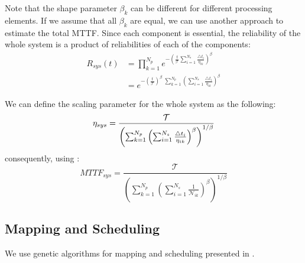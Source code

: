 Note that the shape parameter $\beta_k$ can be different for different processing elements. If we assume that all $\beta_k$ are equal, we can use another approach to estimate the total MTTF. Since each component is essential, the reliability of the whole system is a product of reliabilities of each of the components:
\begin{align*}
  R_{sys}(t) & = \prod_{k=1}^{N_p} e^{-\left( \frac{t}{\mathcal{T}} \sum_{i=1}^{N_s} \frac{\triangle t_i}{\eta_{ik}} \right)^{\beta}} \\
  & = e^{- \left(\frac{t}{\mathcal{T}}\right)^{\beta} \; \sum_{k = 1}^{N_p} \left(  \sum_{i=1}^{N_s} \frac{\triangle t_i}{\eta_{ik}} \right)^{\beta}}
\end{align*}

We can define the scaling parameter for the whole system as the following:
\[
  \eta_{sys} = \frac{\mathcal{T}}{\left(\sum_{k=1}^{N_p} \left(\sum_{i=1}^{N_s}\frac{\triangle t_i}{\eta_{ik}}\right)^{\beta} \right)^{1/\beta}} \\
\]
consequently, using :
\[
  MTTF_{sys} = \frac{\mathcal{T}}{\left(\sum_{k=1}^{N_p} \left(\sum_{i=1}^{N_s}\frac{1}{\mathcal{N}_{ik}}\right)^{\beta} \right)^{1/\beta}}
\]

\subsection{Mapping and Scheduling}
We use genetic algorithms for mapping and scheduling presented in \cite{schmitz2004}.
